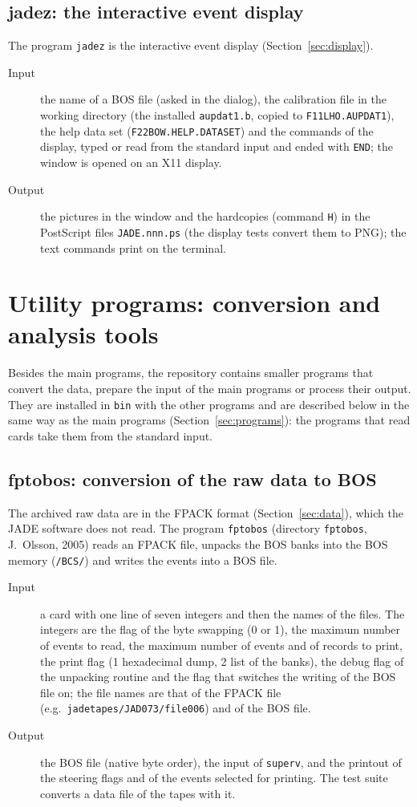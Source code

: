 \subsection{jadez: the interactive event display}
The program \texttt{jadez} is the interactive event display (Section~\ref{sec:display}).
\begin{description}
\item[Input] the name of a BOS file (asked in the dialog), the calibration file in the working directory (the
installed \texttt{aupdat1.b}, copied to \texttt{F11LHO.AUPDAT1}), the help data set (\texttt{F22BOW.HELP.DATASET}) and
the commands of the display, typed or read from the standard input and ended with \texttt{END}; the window is opened
on an X11 display.
\item[Output] the pictures in the window and the hardcopies (command \texttt{H}) in the PostScript files
\texttt{JADE.nnn.ps} (the display tests convert them to PNG); the text commands print on the terminal.
\end{description}

\section{Utility programs: conversion and analysis tools}
\label{sec:utilities}

Besides the main programs, the repository contains smaller programs that convert the data, prepare the input of the main programs or process their
output. They are installed in \texttt{bin} with the other programs and are described below in the same way as the main programs
(Section~\ref{sec:programs}): the programs that read cards take them from the standard input.

\subsection{fptobos: conversion of the raw data to BOS}
\label{sec:fptobos}
The archived raw data are in the FPACK format (Section~\ref{sec:data}), which the JADE software does not read. The program \texttt{fptobos}
(directory \texttt{fptobos}, J.~Olsson, 2005) reads an FPACK file, unpacks the BOS banks into the BOS memory (\texttt{/BCS/}) and writes the events into a BOS file.
\begin{description}
\item[Input] a card with one line of seven integers and then the names of the files. The integers are the flag of the byte swapping (0 or 1),
the maximum number of events to read, the maximum number of events and of records to print, the print flag (1 hexadecimal dump, 2 list of the banks),
the debug flag of the unpacking routine and the flag that switches the writing of the BOS file on; the file names are that of the FPACK file (e.g.\
\texttt{jadetapes/\allowbreak{}JAD073/\allowbreak{}file006}) and of the BOS file.
\item[Output] the BOS file (native byte order), the input of \texttt{superv}, and the printout of the steering flags and of the events selected for printing. The test suite
converts a data file of the tapes with it.
\end{description}

